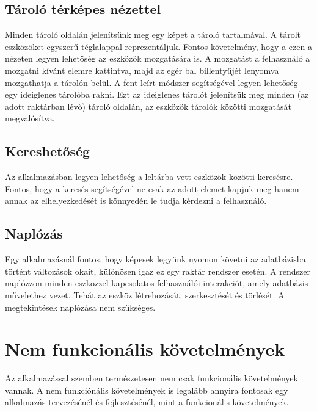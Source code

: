 \subsection{Tároló térképes nézettel}
Minden tároló oldalán jelenítsünk meg egy képet a tároló tartalmával.
A tárolt eszközöket egyszerű téglalappal reprezentáljuk.
Fontos követelmény, hogy a ezen a nézeten legyen lehetőség az eszközök mozgatására is.
A mozgatást a felhasználó a mozgatni kívánt elemre kattintva, majd az egér bal billentyűjét lenyomva mozgathatja a tárolón belül.
A fent leírt módszer segítségével legyen lehetőség egy ideiglenes tárolóba rakni. 
Ezt az ideiglenes tárolót jelenítsük meg minden (az adott raktárban lévő) tároló oldalán, az eszközök tárolók közötti mozgatását megvalósítva.

\subsection{Kereshetőség}
Az alkalmazásban legyen lehetőség a leltárba vett eszközök közötti keresésre.
Fontos, hogy a keresés segítségével ne csak az adott elemet kapjuk meg hanem annak az elhelyezkedését is könnyedén le tudja kérdezni a felhasználó.

\subsection{Naplózás}
Egy alkalmazásnál fontos, hogy képesek legyünk nyomon követni az adatbázisba történt változások okait, különösen igaz ez egy raktár rendszer esetén.
A rendszer naplózzon minden eszközzel kapcsolatos felhasználói interakciót, amely adatbázis művelethez vezet.
Tehát az eszköz létrehozását, szerkesztését és törlését. A megtekintések naplózása nem szükséges.

\section{Nem funkcionális követelmények}

Az alkalmazással szemben természetesen nem csak funkcionális követelmények vannak.
A nem funkciónális követelmények is legalább annyira fontosak egy alkalmazás tervezésénél és fejlesztésénél, mint a funkcionális követelmények.

